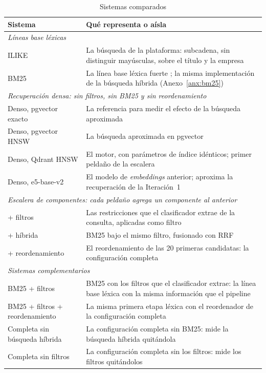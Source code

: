 \begin{table}[!htb]
    \centering
    \caption{Sistemas comparados}
    \label{tab:met-sistemas}
    \small
    \begin{tabular}{|p{4.3cm}|p{9.9cm}|}
        \hline
        \textbf{Sistema} & \textbf{Qué representa o aísla} \\
        \hline
        \multicolumn{2}{|l|}{\textit{Líneas base léxicas}} \\
        \hline
        ILIKE & La búsqueda de la plataforma: subcadena, sin distinguir mayúsculas, sobre el título y la empresa \\
        \hline
        BM25 & La línea base léxica fuerte \citep{Robertson2009}; la misma implementación de la búsqueda híbrida (Anexo~\ref{anx:bm25}) \\
        \hline
        \multicolumn{2}{|l|}{\textit{Recuperación densa: sin filtros, sin BM25 y sin reordenamiento}} \\
        \hline
        Denso, pgvector exacto & La referencia para medir el efecto de la búsqueda aproximada \\
        \hline
        Denso, pgvector HNSW & La búsqueda aproximada en pgvector \\
        \hline
        Denso, Qdrant HNSW & El motor, con parámetros de índice idénticos; primer peldaño de la escalera \\
        \hline
        Denso, e5-base-v2 & El modelo de \textit{embeddings} anterior; aproxima la recuperación de la Iteración~1 \\
        \hline
        \multicolumn{2}{|l|}{\textit{Escalera de componentes: cada peldaño agrega un componente al anterior}} \\
        \hline
        + filtros & Las restricciones que el clasificador extrae de la consulta, aplicadas como filtro \\
        \hline
        + híbrida & BM25 bajo el mismo filtro, fusionado con RRF \\
        \hline
        + reordenamiento & El reordenamiento de las 20 primeras candidatas: la configuración completa \\
        \hline
        \multicolumn{2}{|l|}{\textit{Sistemas complementarios}} \\
        \hline
        BM25 + filtros & BM25 con los filtros que el clasificador extrae: la línea base léxica con la misma información que el pipeline \\
        \hline
        BM25 + filtros + reordenamiento & La misma primera etapa léxica con el reordenador de la configuración completa \\
        \hline
        Completa sin búsqueda híbrida & La configuración completa sin BM25: mide la búsqueda híbrida quitándola \\
        \hline
        Completa sin filtros & La configuración completa sin los filtros: mide los filtros quitándolos \\
        \hline
    \end{tabular}
\end{table}

